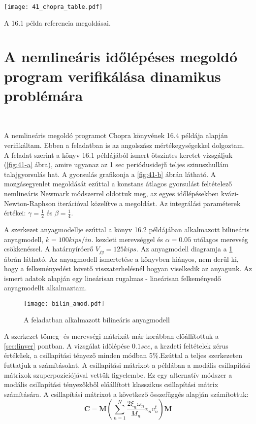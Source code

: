 \begin{table}[p]
\centering
\texttt{[image: 41\_chopra\_table.pdf]}
\caption{A \cite{chopra} 16.1 példa referencia  megoldásai.}
\label{161_table}
\end{table}




\newpage
\section{A nemlineáris időlépéses megoldó program verifikálása dinamikus problémára}

{\ }

A nemlineáris megoldó programot  Chopra könyvének \cite{chopra} 16.4 példája alapján verifikáltam.  Ebben a feladatban is az angolszász mértékegységekkel dolgoztam. A feladat szerint a könyv 16.1 példájából ismert  ötszintes keretet vizsgáljuk (\ref{fig:41-a} ábra), amire ugyanaz az 1 sec periódusidejű teljes szinuszhullám talajgyorsulás hat. A gyorsulás grafikonja a \ref{fig:41-b} ábrán látható. A mozgásegyenlet megoldását ezúttal a  konstans átlagos gyorsulást feltételező nemlineáris Newmark módszerrel oldottuk meg, az egyes időlépésekben kvázi-Newton-Raphson iterációval közelítve a megoldást. Az integrálási paraméterek értékei: $\gamma = \frac{1}{2}$ és $\beta = \frac{1}{4}$. 

A szerkezet anyagmodellje ezúttal a könyv 16.2 példájában alkalmazott  bilineáris  anyagmodell, $k = 100 kips/in.$ kezdeti merevséggel és $\alpha = 0.05$ utólagos merevség csökkenéssel. A határnyíróerő $V_{jy} = 125 kips$. Az anyagmodell diagramja a \ref{fig:nemlinpassz amodell} ábrán látható. Az anyagmodell ismertetése a könyvben hiányos, nem derül ki, hogy a felkeményedést követő visszaterhelésnél hogyan viselkedik az anyagunk. Az ismert adatok alapján egy lineárisan rugalmas - lineárisan felkeményedő anyagmodellt alkalmaztam.

\begin{figure}[h!]
\centering
\texttt{[image: bilin\_amod.pdf]}
\caption{A feladatban alkalmazott bilineáris anyagmodell \cite{chopra}}
\label{fig:nemlinpassz amodell}
\end{figure}

 A szerkezet tömeg- és merevségi mátrixát már korábban előállítottuk a \ref{sec:linver} pontban. A vizsgálat időlépése $0.1 sec$, a kezdeti feltételek zérus értékűek,  a csillapítási tényező minden módban 5\%.Ezúttal a teljes szerkezeten futtatjuk  a számításokat. A csillapítási mátrixot a példában  a modális csillapítási mátrixok szuperpozíciójával vettük figyelembe. Ez egy alternatív módszer a modális csillapítási tényezőkből előállított klasszikus csillapítási mátrix számítására. A csillapítási mátrixot a következő összefüggés alapján számítottuk:
\begin{equation*}
     \mathbf{C}  = \mathbf{M}(\sum_{n = 1}^{N}\frac{2\xi_n\omega_n}{M_n}v_nv^t_n)\mathbf{M}     
\end{equation*}

